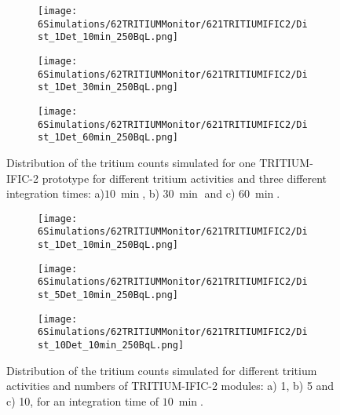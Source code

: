 \begin{figure}
\centering
    \begin{subfigure}[b]{0.6\textwidth}
    \centering
    \texttt{[image: 6Simulations/62TRITIUMMonitor/621TRITIUMIFIC2/Dist\_1Det\_10min\_250BqL.png]}  
    \caption{\label{subfig:1Det10min250BqLST}}
    \end{subfigure}
    \hfill
    \begin{subfigure}[b]{0.6\textwidth}
    \centering
    \texttt{[image: 6Simulations/62TRITIUMMonitor/621TRITIUMIFIC2/Dist\_1Det\_30min\_250BqL.png]}  
    \caption{\label{subfig:1Det30min250BqLST}}
    \end{subfigure}
    \hfill
    \begin{subfigure}[b]{0.6\textwidth}
    \centering
    \texttt{[image: 6Simulations/62TRITIUMMonitor/621TRITIUMIFIC2/Dist\_1Det\_60min\_250BqL.png]}  
    \caption{\label{subfig:1Det60min250BqLST}}
    \end{subfigure}
 \caption{Distribution of the tritium counts simulated for one TRITIUM-IFIC-2 prototype for different tritium activities and three different integration times: a)$10~\min$, b) $30~\min$ and c) $60~\min$.}
 \label{fig:1Det250BqLseveralTimes}
\end{figure} 

\begin{figure}
\centering
    \begin{subfigure}[b]{0.6\textwidth}
    \centering
    \texttt{[image: 6Simulations/62TRITIUMMonitor/621TRITIUMIFIC2/Dist\_1Det\_10min\_250BqL.png]}  
    \caption{\label{subfig:1Det10min250BqLSD}}
    \end{subfigure}
    \hfill
    \begin{subfigure}[b]{0.6\textwidth}
    \centering
    \texttt{[image: 6Simulations/62TRITIUMMonitor/621TRITIUMIFIC2/Dist\_5Det\_10min\_250BqL.png]}  
    \caption{\label{subfig:5Det10min250BqLSD}}
    \end{subfigure}
    \hfill
    \begin{subfigure}[b]{0.6\textwidth}
    \centering
    \texttt{[image: 6Simulations/62TRITIUMMonitor/621TRITIUMIFIC2/Dist\_10Det\_10min\_250BqL.png]}  
    \caption{\label{subfig:10Det10min250BqLSD}}
    \end{subfigure}
 \caption{Distribution of the tritium counts simulated for different tritium activities and numbers of TRITIUM-IFIC-2 modules: a) 1, b) 5 and c) 10, for an integration time of $10~\min$.}
 \label{fig:SeveralDet250BqL10min}
\end{figure}

